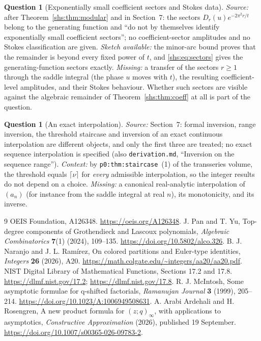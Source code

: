 \documentclass[11pt]{article}
\theoremstyle{definition}
\newtheorem{question}[theorem]{Question}
\theoremstyle{plain}
\begin{document}
\begin{question}[Exponentially small coefficient sectors and Stokes data]\label{shs:q:sectors}
\emph{Source:} after Theorem~\ref{shs:thm:modular} and in Section~7: the
sectors $D_r(u)e^{-2\pi^2r/t}$ belong to the generating function and ``do
not by themselves identify exponentially small coefficient sectors''; no
coefficient-sector amplitudes and no Stokes classification are given.
\emph{Sketch available:} the minor-arc bound proves that the remainder is
beyond every fixed power of $t$, and \eqref{shs:eq:sectors} gives the
generating-function sectors exactly. \emph{Missing:} a transfer of the
sectors $r\ge1$ through the saddle integral (the phase $u$ moves with
$t$), the resulting coefficient-level amplitudes, and their Stokes
behaviour. Whether such sectors are visible against the algebraic
remainder of Theorem~\ref{shs:thm:coeff} at all is part of the question.
\end{question}

\begin{question}[An exact interpolation]\label{shs:q:interpolation}
\emph{Source:} Section~7: formal inversion, range inversion, the
threshold staircase and inversion of an exact continuous interpolation
are different objects, and only the first three are treated; no exact
sequence interpolation is specified (also \nolinkurl{derivation.md},
``Inversion on the sequence range''). \emph{Context:} by
\texttt{p0:thm:staircase}~(1) of the transseries volume, the threshold
equals $\lceil\nu\rceil$ for \emph{every} admissible interpolation, so the
integer results do not depend on a choice. \emph{Missing:} a canonical
real-analytic interpolation of $(a_n)$ (for instance from the saddle
integral at real $n$), its monotonicity, and its inverse.
\end{question}
\begin{thebibliography}{9}
 OEIS Foundation, A126348. \url{https://oeis.org/A126348}.
 J. Pan and T. Yu, Top-degree components of Grothendieck and
Lascoux polynomials, \emph{Algebraic Combinatorics} \textbf{7}(1)
(2024), 109--135. \url{https://doi.org/10.5802/alco.326}.
 B. J. Naranjo and J. L. Ram\'irez, On colored partitions and
Euler-type identities, \emph{Integers} \textbf{26} (2026), A20.
\url{https://math.colgate.edu/~integers/aa20/aa20.pdf}.
 NIST Digital Library of Mathematical Functions, Sections
17.2 and 17.8. \url{https://dlmf.nist.gov/17.2}; \url{https://dlmf.nist.gov/17.8}.
 R. J. McIntosh, Some asymptotic formulae for q-shifted
factorials, \emph{Ramanujan Journal} \textbf{3} (1999), 205--214.
\url{https://doi.org/10.1023/A:1006949508631}.
 A. Arabi Ardehali and H. Rosengren, A new product formula for
$(z;q)_\infty$, with applications to asymptotics,
\emph{Constructive Approximation} (2026), published 19 September.
\url{https://doi.org/10.1007/s00365-026-09783-2}.
\end{thebibliography}
\end{document}
